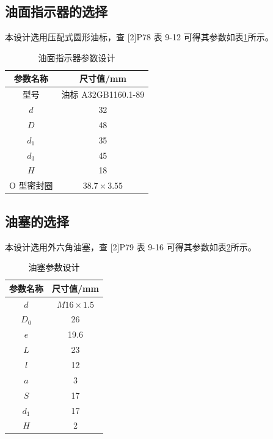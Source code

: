 \documentclass[12pt]{ctexart}
\begin{document}
\subsection{油面指示器的选择}
本设计选用压配式圆形油标，查 [2]P78 表 9-12 可得其参数如表\ref{table21}所示。
\begin{table}[htbp]
    \centering
    \setlength{\belowcaptionskip}{0.3cm}
    \caption{油面指示器参数设计}
    \begin{tabular}{c c}
        \toprule
        参数名称  &  尺寸值/mm \\
        \midrule
        型号     & 油标 A32GB1160.1-89\\
        $d$ & 32\\
        $D$ & 48\\
        $d_1$ & 35\\
        $d_3$ & 45 \\
        $H$ & 18\\
        O 型密封圈 & $38.7\times 3.55$\\
        \bottomrule
    \end{tabular}
    
    \label{table21}
\end{table}

\subsection{油塞的选择}
本设计选用外六角油塞，查 [2]P79 表 9-16 可得其参数如表\ref{table22}所示。
\begin{table}[htbp]
    \centering
    \setlength{\belowcaptionskip}{0.3cm}
    \caption{油塞参数设计}
    \begin{tabular}{c c}
        \toprule
        参数名称  &  尺寸值/mm \\
        \midrule
        $d$ & $M16\times 1.5$\\
        $D_0$ & 26\\
        $e$  & 19.6\\
        $L$ & 23\\
        $l$ & 12\\
        $a$ & 3\\
        $S$ & 17\\
        $d_1$ & 17\\
        $H $ & 2\\
        \bottomrule
    \end{tabular}
    
    \label{table22}
\end{table}
\end{document}
